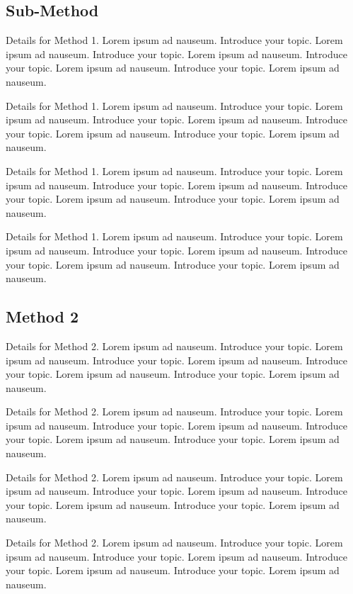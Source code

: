\documentclass{bioinfo}
\begin{document}
\subsection{Sub-Method}

Details for Method 1. Lorem ipsum ad nauseum. Introduce your topic.
Lorem ipsum ad nauseum. Introduce your topic. Lorem ipsum ad nauseum.
Introduce your topic. Lorem ipsum ad nauseum. Introduce your topic.
Lorem ipsum ad nauseum.

Details for Method 1. Lorem ipsum ad nauseum. Introduce your topic.
Lorem ipsum ad nauseum. Introduce your topic. Lorem ipsum ad nauseum.
Introduce your topic. Lorem ipsum ad nauseum. Introduce your topic.
Lorem ipsum ad nauseum.

Details for Method 1. Lorem ipsum ad nauseum. Introduce your topic.
Lorem ipsum ad nauseum. Introduce your topic. Lorem ipsum ad nauseum.
Introduce your topic. Lorem ipsum ad nauseum. Introduce your topic.
Lorem ipsum ad nauseum.

Details for Method 1. Lorem ipsum ad nauseum. Introduce your topic.
Lorem ipsum ad nauseum. Introduce your topic. Lorem ipsum ad nauseum.
Introduce your topic. Lorem ipsum ad nauseum. Introduce your topic.
Lorem ipsum ad nauseum.

\subsection{Method 2}

Details for Method 2. Lorem ipsum ad nauseum. Introduce your topic.
Lorem ipsum ad nauseum. Introduce your topic. Lorem ipsum ad nauseum.
Introduce your topic. Lorem ipsum ad nauseum. Introduce your topic.
Lorem ipsum ad nauseum.

Details for Method 2. Lorem ipsum ad nauseum. Introduce your topic.
Lorem ipsum ad nauseum. Introduce your topic. Lorem ipsum ad nauseum.
Introduce your topic. Lorem ipsum ad nauseum. Introduce your topic.
Lorem ipsum ad nauseum.

Details for Method 2. Lorem ipsum ad nauseum. Introduce your topic.
Lorem ipsum ad nauseum. Introduce your topic. Lorem ipsum ad nauseum.
Introduce your topic. Lorem ipsum ad nauseum. Introduce your topic.
Lorem ipsum ad nauseum.

Details for Method 2. Lorem ipsum ad nauseum. Introduce your topic.
Lorem ipsum ad nauseum. Introduce your topic. Lorem ipsum ad nauseum.
Introduce your topic. Lorem ipsum ad nauseum. Introduce your topic.
Lorem ipsum ad nauseum.
\end{document}
